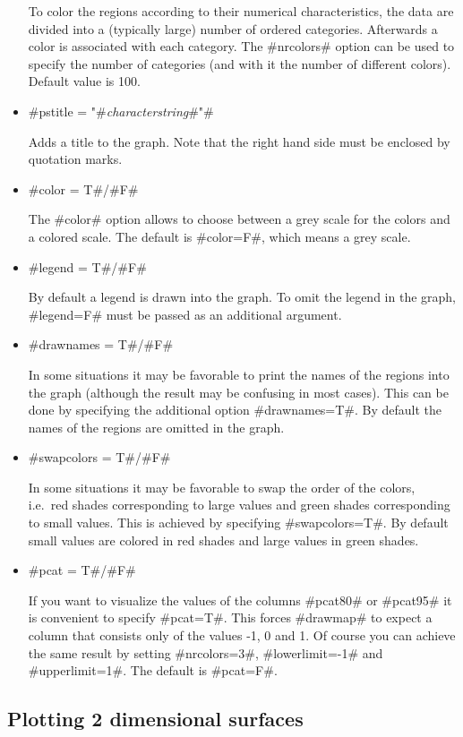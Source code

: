 \begin{itemize}
To color the regions according to their numerical characteristics,
the data are divided into a (typically large) number of ordered
categories. Afterwards a color is associated with each category.
The #nrcolors# option can be used to specify the number of
categories (and with it the number of different colors). Default
value is 100.

\item #pstitle = "#{\em characterstring}#"#

Adds a title to the graph. Note that the right hand side must be
enclosed by quotation marks.

\item #color = T#/#F#

The #color# option allows to choose between a grey scale for the
colors and a colored scale. The default is #color=F#, which means
a grey scale.

\item #legend = T#/#F#

By default a legend is drawn into the graph. To omit the legend in
the graph, #legend=F# must be passed as an additional argument.

\item #drawnames = T#/#F#

In some situations it may be favorable to print the names of the
regions into the graph (although the result may be confusing in
most cases). This can be done by specifying the additional option
#drawnames=T#. By default the names of the regions are omitted in
the graph.

\item #swapcolors = T#/#F#

In some situations it may be favorable to swap the order of the
colors, i.e.~red shades corresponding to large values and green
shades corresponding to small values. This is achieved by
specifying #swapcolors=T#. By default small values are colored in
red shades and large values in green shades.

\item #pcat = T#/#F#

If you want to visualize the values of the columns #pcat80# or
#pcat95# it is convenient to specify #pcat=T#. This forces
#drawmap# to expect a column that consists only of the values -1,
0 and 1. Of course you can achieve the same result by setting
#nrcolors=3#, #lowerlimit=-1# and #upperlimit=1#. The default is
#pcat=F#.
\end{itemize}

\subsection{Plotting 2 dimensional surfaces}
\label{splusplotsurf}  

